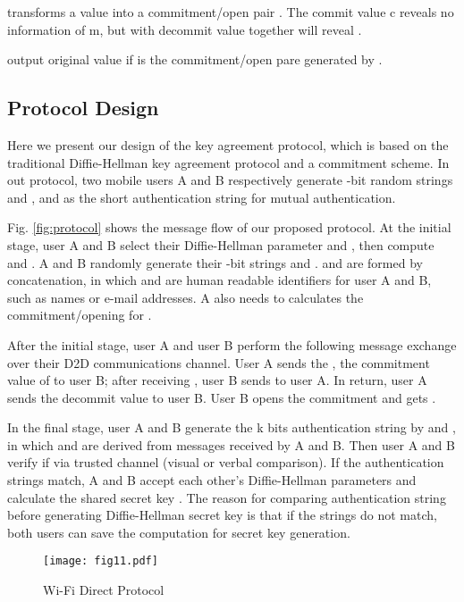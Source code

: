 \documentclass[conference]{IEEEtran}
\begin{document}
\noindent  transforms a value  into a commitment/open pair . The commit value c reveals no information of m, but with decommit value  together  will reveal .

\noindent  output original value  if  is the commitment/open pare generated by .

\subsection{Protocol Design}

Here we present our design of the key agreement protocol, which is based on the traditional Diffie-Hellman key agreement protocol and a commitment scheme. In out protocol, two mobile users A and B respectively generate -bit random strings  and , and  as the short authentication string for mutual authentication.

Fig. \ref{fig:protocol} shows the message flow of our proposed protocol. At the initial stage, user A and B select their Diffie-Hellman parameter  and , then compute  and . A and B randomly generate their -bit strings  and .  and  are formed by concatenation, in which  and  are human readable identifiers for user A and B, such as names or e-mail addresses. A also needs to calculates the commitment/opening  for . 

After the initial stage, user A and user B perform the following message exchange over their D2D communications channel. User A sends the , the commitment value of  to user B; after receiving , user B sends  to user A. In return, user A sends the decommit value  to user B. User B opens the commitment and gets . 

In the final stage, user A and B generate the k bits authentication string by  and , in which  and  are derived from messages received by A and B. Then user A and B verify if  via trusted channel (visual or verbal comparison). If the authentication strings match, A and B accept each other's Diffie-Hellman parameters and calculate the shared secret key . The reason for comparing authentication string before generating Diffie-Hellman secret key is that if the strings do not match, both users can save the computation for secret key generation.


\begin{figure*}[htbp]
  \centering
  \scalebox{0.571}
  {\texttt{[image: fig11.pdf]}}
  \caption{Wi-Fi Direct Protocol}
  \label{fig:fig2}
    \vspace{-3mm}
\end{figure*}
\end{document}
